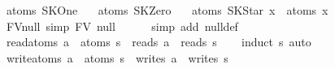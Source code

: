 \begin{isabellebody}
{}\ {}atoms\ SKOne\ {}\ {}{}{}\isanewline
{}\ {}atoms\ SKZero\ {}\ {}{}{}\isanewline
{}\ {}atoms\ {}SKStar\ x{}\ {}\ atoms\ x{}\isanewline
\isanewline
{}\isamarkupfalse%
\ FV{}null\ {}simp{}{}\ {}FV\ null\ {}\ {}{}{}\isanewline
%
\isadelimproof
\ \ %
\endisadelimproof
%
\isatagproof
{}\isamarkupfalse%
\ {}simp\ add{}\ null{}def{}%
\endisatagproof
{\isafoldproof}%
%
\isadelimproof
\isanewline
%
\endisadelimproof
\isanewline
{}\isamarkupfalse%
\ read{}atoms{}\ {}a\ {}\ atoms\ s\ {}\ reads\ a\ {}\ reads\ s{}\isanewline
%
\isadelimproof
\ \ %
\endisadelimproof
%
\isatagproof
{}\isamarkupfalse%
\ {}induct\ s{}\ auto{}%
\endisatagproof
{\isafoldproof}%
%
\isadelimproof
\isanewline
%
\endisadelimproof
\isanewline
{}\isamarkupfalse%
\ write{}atoms{}\ {}a\ {}\ atoms\ s\ {}\ writes\ a\ {}\ writes\ s{}\isanewline

\end{isabellebody}
